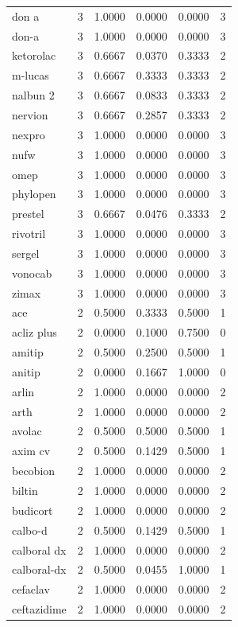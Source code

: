\begin{longtable}{p{3.0cm}rrrrr}
don a & 3 & 1.0000 & 0.0000 & 0.0000 & 3 \\
don-a & 3 & 1.0000 & 0.0000 & 0.0000 & 3 \\
ketorolac & 3 & 0.6667 & 0.0370 & 0.3333 & 2 \\
m-lucas & 3 & 0.6667 & 0.3333 & 0.3333 & 2 \\
nalbun 2 & 3 & 0.6667 & 0.0833 & 0.3333 & 2 \\
nervion & 3 & 0.6667 & 0.2857 & 0.3333 & 2 \\
nexpro & 3 & 1.0000 & 0.0000 & 0.0000 & 3 \\
nufw & 3 & 1.0000 & 0.0000 & 0.0000 & 3 \\
omep & 3 & 1.0000 & 0.0000 & 0.0000 & 3 \\
phylopen & 3 & 1.0000 & 0.0000 & 0.0000 & 3 \\
prestel & 3 & 0.6667 & 0.0476 & 0.3333 & 2 \\
rivotril & 3 & 1.0000 & 0.0000 & 0.0000 & 3 \\
sergel & 3 & 1.0000 & 0.0000 & 0.0000 & 3 \\
vonocab & 3 & 1.0000 & 0.0000 & 0.0000 & 3 \\
zimax & 3 & 1.0000 & 0.0000 & 0.0000 & 3 \\
ace & 2 & 0.5000 & 0.3333 & 0.5000 & 1 \\
acliz plus & 2 & 0.0000 & 0.1000 & 0.7500 & 0 \\
amitip & 2 & 0.5000 & 0.2500 & 0.5000 & 1 \\
anitip & 2 & 0.0000 & 0.1667 & 1.0000 & 0 \\
arlin & 2 & 1.0000 & 0.0000 & 0.0000 & 2 \\
arth & 2 & 1.0000 & 0.0000 & 0.0000 & 2 \\
avolac & 2 & 0.5000 & 0.5000 & 0.5000 & 1 \\
axim cv & 2 & 0.5000 & 0.1429 & 0.5000 & 1 \\
becobion & 2 & 1.0000 & 0.0000 & 0.0000 & 2 \\
biltin & 2 & 1.0000 & 0.0000 & 0.0000 & 2 \\
budicort & 2 & 1.0000 & 0.0000 & 0.0000 & 2 \\
calbo-d & 2 & 0.5000 & 0.1429 & 0.5000 & 1 \\
calboral dx & 2 & 1.0000 & 0.0000 & 0.0000 & 2 \\
calboral-dx & 2 & 0.5000 & 0.0455 & 1.0000 & 1 \\
cefaclav & 2 & 1.0000 & 0.0000 & 0.0000 & 2 \\
ceftazidime & 2 & 1.0000 & 0.0000 & 0.0000 & 2 \\

\end{longtable}
